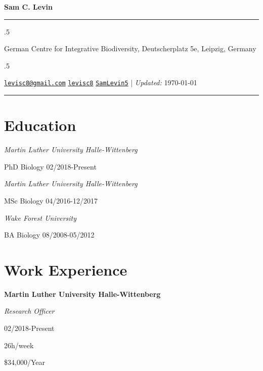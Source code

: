 \documentclass[11pt,]{article}
\begin{document}
\centerline{\huge \bf Sam C. Levin}

\vspace{2 mm}

\hrule

\vspace{2 mm}


\moveleft.5\hoffset\centerline{German Centre for Integrative
Biodiversity, Deutscherplatz 5e, Leipzig, Germany}
\moveleft.5\hoffset\centerline{ \faEnvelopeO \hspace{1 mm} \href{mailto:}{\tt \href{mailto:levisc8@gmail.com}{\nolinkurl{levisc8@gmail.com}}} \hspace{1 mm}  \faGithub \hspace{1 mm} \href{http://github.com/levisc8}{\tt levisc8} \hspace{1 mm}   \faTwitter \hspace{1 mm} \href{https:/twitter.com/SamLevin5}{\tt SamLevin5} \hspace{1 mm}    | \emph{Updated:} \today}

\vspace{2 mm}

\hrule


\hypertarget{education}{%
\section{Education}\label{education}}

\emph{Martin Luther University Halle-Wittenberg}

PhD Biology \hfill 02/2018-Present

\emph{Martin Luther University Halle-Wittenberg}

MSc Biology \hfill 04/2016-12/2017

\emph{Wake Forest University}

BA Biology \hfill 08/2008-05/2012

\hypertarget{work-experience}{%
\section{Work Experience}\label{work-experience}}

\textbf{Martin Luther University Halle-Wittenberg}

\emph{Research Officer}

02/2018-Present

26h/week

\$34,000/Year
\end{document}
